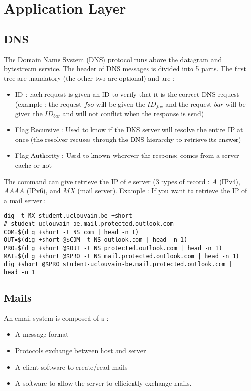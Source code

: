 \newpage
\section{Application Layer}

\subsection{DNS}

The Domain Name System (DNS) protocol runs above the datagram and bytestream service. The header of DNS messages is divided into 5 parts. The first tree are mandatory (the other two are optional) and are :
\begin{itemize}
\item ID : each request is given an ID to verify that it is the correct DNS request (example : the request $foo$ will be given the $ID_{foo}$ and the request $bar$ will be given the $ID_{bar}$ and will not conflict when the response is send)
\item Flag Recursive : Used to know if the DNS server will resolve the entire IP at once (the resolver recuses through the DNS hierarchy to retrieve its answer)
\item Flag Authority : Used to known wherever the response comes from a server cache or not
\end{itemize}

The command  can give retrieve the IP of e server (3 types of record : $A$ (IPv4), $AAAA$ (IPv6), and $MX$ (mail server). Example : If you want to retrieve the IP of a mail server :
\begin{verbatim}
dig -t MX student.uclouvain.be +short
# student-uclouvain-be.mail.protected.outlook.com
COM=$(dig +short -t NS com | head -n 1)
OUT=$(dig +short @$COM -t NS outlook.com | head -n 1)
PRO=$(dig +short @$OUT -t NS protected.outlook.com | head -n 1)
MAI=$(dig +short @$PRO -t NS mail.protected.outlook.com | head -n 1)
dig +short @$PRO student-uclouvain-be.mail.protected.outlook.com | head -n 1
\end{verbatim}

\subsection{Mails}

An email system is composed of a :
\begin{itemize}
\item A message format
\item Protocols exchange between host and server
\item A client software to create/read mails
\item A software to allow the server to efficiently exchange mails.
\end{itemize}


